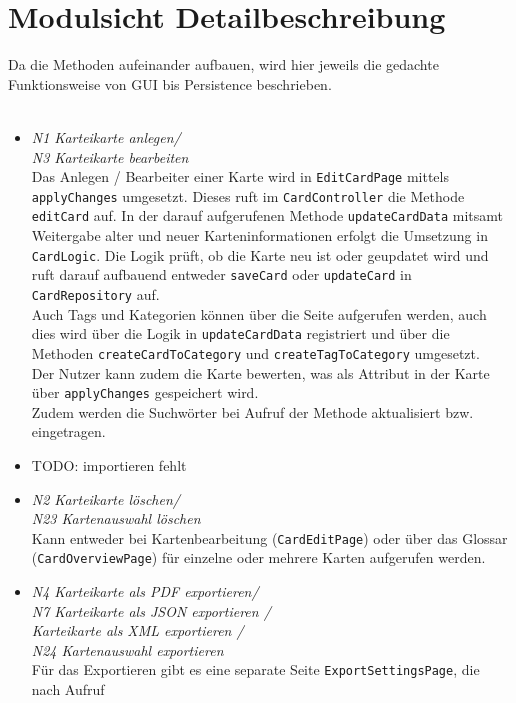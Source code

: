 \documentclass[fontsize=12pt,paper=A4,twoside]{scrartcl}
\begin{document}
    \section{Modulsicht Detailbeschreibung}
    Da die Methoden aufeinander aufbauen, wird hier jeweils die gedachte Funktionsweise von GUI bis Persistence beschrieben.\\\\
    \begin{itemize}
    \item \textit{N1 Karteikarte anlegen/\\ N3 Karteikarte bearbeiten}\\ 
    Das Anlegen / Bearbeiter einer Karte wird in \texttt{EditCardPage} mittels \texttt{applyChanges} umgesetzt.
    Dieses ruft im \texttt{CardController} die Methode \texttt{editCard} auf. In der darauf aufgerufenen Methode 
    \texttt{updateCardData} mitsamt Weitergabe alter und neuer Karteninformationen erfolgt die Umsetzung in \texttt{CardLogic}.
    Die Logik prüft, ob die Karte neu ist oder geupdatet wird und ruft darauf aufbauend entweder \texttt{saveCard} oder \texttt{updateCard}
    in \texttt{CardRepository} auf.\\
    Auch Tags und Kategorien können über die Seite aufgerufen werden, auch dies wird über die Logik in \texttt{updateCardData} registriert und über die Methoden 
    \texttt{createCardToCategory} und \texttt{createTagToCategory} umgesetzt.\\
    Der Nutzer kann zudem die Karte bewerten, was als Attribut in der Karte über \texttt{applyChanges} gespeichert wird.\\
    Zudem werden die Suchwörter bei Aufruf der Methode aktualisiert bzw. eingetragen.
    \item TODO: importieren fehlt\\
    \item \textit{N2 Karteikarte löschen/\\ N23 Kartenauswahl löschen}\\ 
    Kann entweder bei Kartenbearbeitung (\texttt{CardEditPage}) oder über das Glossar (\texttt{CardOverviewPage}) 
    für einzelne oder mehrere Karten aufgerufen werden.
    \item \textit{N4 Karteikarte als PDF exportieren/\\ N7 Karteikarte als JSON exportieren /\\Karteikarte als XML exportieren /\\ N24 Kartenauswahl exportieren}\\ Für das Exportieren gibt es eine separate Seite \texttt{ExportSettingsPage}, die nach Aufruf 

\end{itemize}
\end{document}
